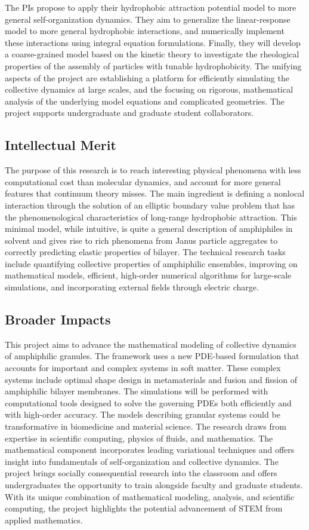 \documentclass[10pt]{article}
\begin{document}
The PIs propose to apply their hydrophobic attraction potential model to
more general self-organization dynamics. They aim to generalize the
linear-response model to more general hydrophobic interactions, and
numerically implement these interactions using integral equation
formulations. Finally, they will develop a coarse-grained model based on 
the kinetic theory to investigate the rheological properties of the assembly of 
particles with tunable hydrophobicity. The unifying
aspects of the project are establishing a platform for efficiently
simulating the collective dynamics at large scales, and the focusing on
rigorous, mathematical analysis of the underlying model equations and
complicated geometries. The project supports undergraduate and graduate
student collaborators.

\subsection*{Intellectual Merit}
\vspace{-0.1in}
The purpose of this research is to reach interesting physical phenomena
with less computational cost than molecular dynamics, and account for
more general features that continuum theory misses. The main ingredient
is defining a nonlocal interaction through the solution of an elliptic
boundary value problem that has the phenomenological characteristics of
long-range hydrophobic attraction. This minimal model, while intuitive,
is quite a general description of amphiphiles in solvent and gives rise
to rich phenomena from Janus particle aggregates to correctly predicting
elastic properties of bilayer. The technical research tasks include
quantifying collective properties of amphiphilic ensembles, improving on
mathematical models, efficient, high-order numerical algorithms for
large-scale simulations, and incorporating external fields through
electric charge.

\subsection*{Broader Impacts}
\vspace{-0.1in}
This project aims to advance the mathematical modeling of collective
dynamics of amphiphilic granules. The framework uses a new PDE-based
formulation that accounts for important and complex systems in soft
matter. These complex systems include optimal shape design in
metamaterials and fusion and fission of amphiphilic bilayer membranes.
The simulations will be performed with computational tools designed to
solve the governing PDEs both efficiently and with high-order accuracy.
The models describing granular systems could be transformative in
biomedicine and material science. The research draws from expertise in
scientific computing, physics of fluids, and mathematics. The
mathematical component incorporates leading variational techniques and
offers insight into fundamentals of self-organization and collective
dynamics. The project brings socially consequential research into the
classroom and offers undergraduates the opportunity to train alongside
faculty and graduate students. With its unique combination of
mathematical modeling, analysis, and scientific computing, the project
highlights the potential advancement of STEM from applied mathematics.
\end{document}
